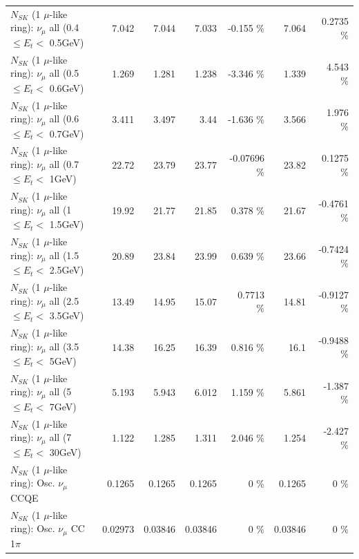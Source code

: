 \begin{table}
\begin{tabular}{| l | r | r | r  r | r  r |}
       $N_{SK}$ (1 $\mu$-like ring): $\nu_{\mu}$ all (0.4 $\leq E_{t} <$ 0.5GeV) &           7.042 &           7.044 &           7.033 &   -0.155 \%  &           7.064 &   0.2735 \%  \\ 
       $N_{SK}$ (1 $\mu$-like ring): $\nu_{\mu}$ all (0.5 $\leq E_{t} <$ 0.6GeV) &           1.269 &           1.281 &           1.238 &   -3.346 \%  &           1.339 &    4.543 \%  \\ 
       $N_{SK}$ (1 $\mu$-like ring): $\nu_{\mu}$ all (0.6 $\leq E_{t} <$ 0.7GeV) &           3.411 &           3.497 &            3.44 &   -1.636 \%  &           3.566 &    1.976 \%  \\ 
         $N_{SK}$ (1 $\mu$-like ring): $\nu_{\mu}$ all (0.7 $\leq E_{t} <$ 1GeV) &           22.72 &           23.79 &           23.77 & -0.07696 \%  &           23.82 &   0.1275 \%  \\ 
         $N_{SK}$ (1 $\mu$-like ring): $\nu_{\mu}$ all (1 $\leq E_{t} <$ 1.5GeV) &           19.92 &           21.77 &           21.85 &    0.378 \%  &           21.67 &  -0.4761 \%  \\ 
       $N_{SK}$ (1 $\mu$-like ring): $\nu_{\mu}$ all (1.5 $\leq E_{t} <$ 2.5GeV) &           20.89 &           23.84 &           23.99 &    0.639 \%  &           23.66 &  -0.7424 \%  \\ 
       $N_{SK}$ (1 $\mu$-like ring): $\nu_{\mu}$ all (2.5 $\leq E_{t} <$ 3.5GeV) &           13.49 &           14.95 &           15.07 &   0.7713 \%  &           14.81 &  -0.9127 \%  \\ 
         $N_{SK}$ (1 $\mu$-like ring): $\nu_{\mu}$ all (3.5 $\leq E_{t} <$ 5GeV) &           14.38 &           16.25 &           16.39 &    0.816 \%  &            16.1 &  -0.9488 \%  \\ 
           $N_{SK}$ (1 $\mu$-like ring): $\nu_{\mu}$ all (5 $\leq E_{t} <$ 7GeV) &           5.193 &           5.943 &           6.012 &    1.159 \%  &           5.861 &   -1.387 \%  \\ 
          $N_{SK}$ (1 $\mu$-like ring): $\nu_{\mu}$ all (7 $\leq E_{t} <$ 30GeV) &           1.122 &           1.285 &           1.311 &    2.046 \%  &           1.254 &   -2.427 \%  \\ 
\hline
\hline
                               $N_{SK}$ (1 $\mu$-like ring): Osc. $\nu_\mu$ CCQE &          0.1265 &          0.1265 &          0.1265 &        0 \%  &          0.1265 &        0 \%  \\ 
                          $N_{SK}$ (1 $\mu$-like ring): Osc. $\nu_\mu$ CC 1$\pi$ &         0.02973 &         0.03846 &         0.03846 &        0 \%  &         0.03846 &        0 \%  \\ 

\end{tabular}
\end{table}
